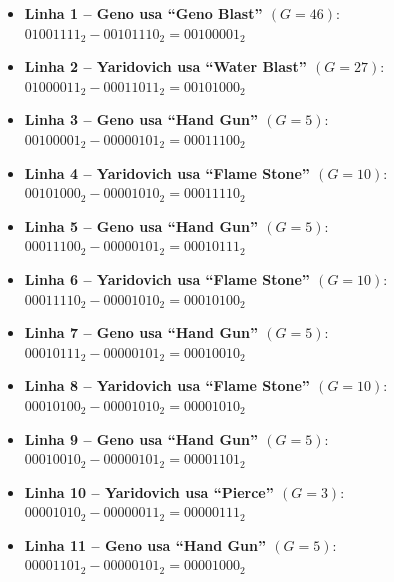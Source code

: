 \documentclass[12pt]{article}
\begin{document}
\begin{itemize}

\item \textbf{Linha 1 – Geno usa ``Geno Blast'' $(G=46)$}: $01001111_2 - 00101110_2 = 00100001_2$
\vspace{0.1cm}

\item \textbf{Linha 2 – Yaridovich usa ``Water Blast'' $(G=27)$}: $01000011_2 - 00011011_2 = 00101000_2$
\vspace{0.1cm}

\item \textbf{Linha 3 – Geno usa ``Hand Gun'' $(G=5)$}: $00100001_2 - 00000101_2 = 00011100_2$
\vspace{0.1cm}

\item \textbf{Linha 4 – Yaridovich usa ``Flame Stone'' $(G=10)$}: $00101000_2 - 00001010_2 = 00011110_2$
\vspace{0.1cm}

\item \textbf{Linha 5 – Geno usa ``Hand Gun'' $(G=5)$}: $00011100_2 - 00000101_2 = 00010111_2$
\vspace{0.1cm}

\item \textbf{Linha 6 – Yaridovich usa ``Flame Stone'' $(G=10)$}: $00011110_2 - 00001010_2 = 00010100_2$
\vspace{0.1cm}

\item \textbf{Linha 7 – Geno usa ``Hand Gun'' $(G=5)$}: $00010111_2 - 00000101_2 = 00010010_2$
\vspace{0.1cm}

\item \textbf{Linha 8 – Yaridovich usa ``Flame Stone'' $(G=10)$}: $00010100_2 - 00001010_2 = 00001010_2$
\vspace{0.1cm}

\item \textbf{Linha 9 – Geno usa ``Hand Gun'' $(G=5)$}: $00010010_2 - 00000101_2 = 00001101_2$
\vspace{0.1cm}

\item \textbf{Linha 10 – Yaridovich usa ``Pierce'' $(G=3)$}: $00001010_2 - 00000011_2 = 00000111_2$
\vspace{0.1cm}

\item \textbf{Linha 11 – Geno usa ``Hand Gun'' $(G=5)$}: $00001101_2 - 00000101_2 = 00001000_2$
\vspace{0.1cm}


\end{itemize}
\end{document}
